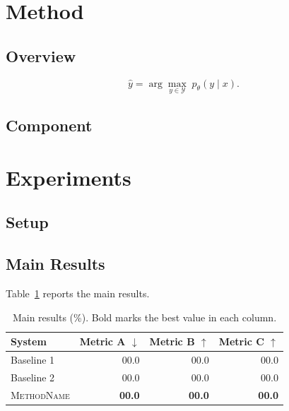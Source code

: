 \documentclass[11pt,letterpaper]{soar_preprint}
\newcommand{\sysname}{\textsc{MethodName}}
\begin{document}
\section{Method}
\label{sec:method}

\subsection{Overview}
\lipsum[6][1-4]
\begin{equation}
  \hat{y} = \arg\max_{y \in \mathcal{Y}} \; p_\theta(y \mid x).
  \label{eq:example}
\end{equation}

\subsection{Component}
\lipsum[7][1-4]

\section{Experiments}
\label{sec:experiments}

\subsection{Setup}
\lipsum[8][1-3]

\subsection{Main Results}
Table~\ref{tab:example} reports the main results.

\begin{table}[!htbp]
\centering
\small
\begin{tabular}{lrrr}
\toprule
System & Metric A $\downarrow$ & Metric B $\uparrow$ & Metric C $\uparrow$ \\
\midrule
Baseline 1 & 00.0 & 00.0 & 00.0 \\
Baseline 2 & 00.0 & 00.0 & 00.0 \\
\midrule
\sysname{} & \textbf{00.0} & \textbf{00.0} & \textbf{00.0} \\
\bottomrule
\end{tabular}
\caption{Main results (\%). Bold marks the best value in each column.}
\label{tab:example}
\end{table}

\lipsum[9][1-4]

\lipsum[10][1-3]
\end{document}
